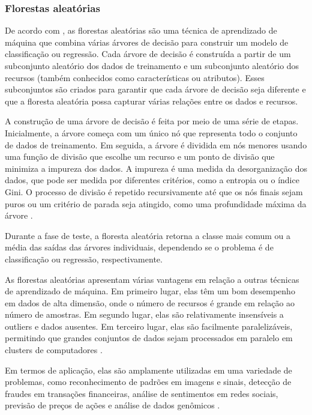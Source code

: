 \subsubsection{Florestas aleatórias}

De acordo com \cite{breiman2001random}, as florestas aleatórias são uma técnica de aprendizado de máquina que combina várias árvores de decisão para construir um modelo de classificação ou regressão. Cada árvore de decisão é construída a partir de um subconjunto aleatório dos dados de treinamento e um subconjunto aleatório dos recursos (também conhecidos como características ou atributos). Esses subconjuntos são criados para garantir que cada árvore de decisão seja diferente e que a floresta aleatória possa capturar várias relações entre os dados e recursos.

A construção de uma árvore de decisão é feita por meio de uma série de etapas. Inicialmente, a árvore começa com um único nó que representa todo o conjunto de dados de treinamento. Em seguida, a árvore é dividida em nós menores usando uma função de divisão que escolhe um recurso e um ponto de divisão que minimiza a impureza dos dados. A impureza é uma medida da desorganização dos dados, que pode ser medida por diferentes critérios, como a entropia ou o índice Gini. O processo de divisão é repetido recursivamente até que os nós finais sejam puros ou um critério de parada seja atingido, como uma profundidade máxima da árvore \citep{cutler2001random}.

Durante a fase de teste, a floresta aleatória retorna a classe mais comum ou a média das saídas das árvores individuais, dependendo se o problema é de classificação ou regressão, respectivamente.

As florestas aleatórias apresentam várias vantagens em relação a outras técnicas de aprendizado de máquina. Em primeiro lugar, elas têm um bom desempenho em dados de alta dimensão, onde o número de recursos é grande em relação ao número de amostras. Em segundo lugar, elas são relativamente insensíveis a outliers e dados ausentes. Em terceiro lugar, elas são facilmente paralelizáveis, permitindo que grandes conjuntos de dados sejam processados em paralelo em clusters de computadores \citep{cutler2001random}.

Em termos de aplicação, elas são amplamente utilizadas em uma variedade de problemas, como reconhecimento de padrões em imagens e sinais, detecção de fraudes em transações financeiras, análise de sentimentos em redes sociais, previsão de preços de ações e análise de dados genômicos \citep{breiman2001random}.

